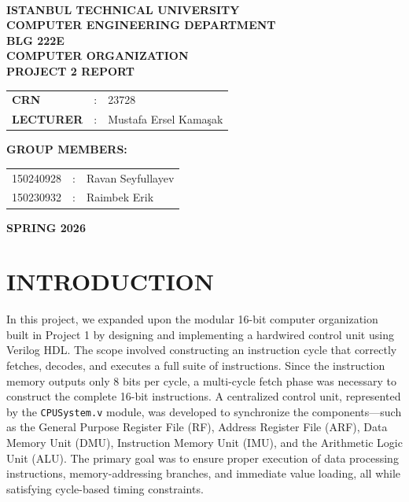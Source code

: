 \documentclass[pdftex,12pt,a4paper]{article}
\begin{document}
\begin{titlepage}
\begin{center}
\textbf{}\\
\textbf{\Large{ISTANBUL TECHNICAL UNIVERSITY}}\\
\vspace{0.5cm}
\textbf{\Large{COMPUTER ENGINEERING DEPARTMENT}}\\
\vspace{4cm}
\textbf{\Large{BLG 222E\\ COMPUTER ORGANIZATION\\ PROJECT 2 REPORT}}\\
\vspace{4cm}
\begin{table}[ht]
\centering
\Large{
\begin{tabular}{lcl}
\textbf{CRN}  & : & 23728 \\
\textbf{LECTURER}  & : & Mustafa Ersel Kamaşak \\
\end{tabular}}
\end{table}
\vspace{1cm}
\textbf{\Large{GROUP MEMBERS:}}\\
\begin{table}[ht]
\centering
\Large{
\begin{tabular}{rcl}
150240928  & : & Ravan Seyfullayev \\
150230932  & : & Raimbek Erik \\
\end{tabular}}
\end{table}
\vspace{2.8cm}
\textbf{\Large{SPRING 2026}}

\end{center}
\end{titlepage}

\thispagestyle{empty}
\setcounter{tocdepth}{4}
\tableofcontents
\clearpage

\setcounter{page}{1}

\section{INTRODUCTION}
In this project, we expanded upon the modular 16-bit computer organization built in Project 1 by designing and implementing a hardwired control unit using Verilog HDL. The scope involved constructing an instruction cycle that correctly fetches, decodes, and executes a full suite of instructions. Since the instruction memory outputs only 8 bits per cycle, a multi-cycle fetch phase was necessary to construct the complete 16-bit instructions. A centralized control unit, represented by the \texttt{CPUSystem.v} module, was developed to synchronize the components---such as the General Purpose Register File (RF), Address Register File (ARF), Data Memory Unit (DMU), Instruction Memory Unit (IMU), and the Arithmetic Logic Unit (ALU). The primary goal was to ensure proper execution of data processing instructions, memory-addressing branches, and immediate value loading, all while satisfying cycle-based timing constraints.
\end{document}
